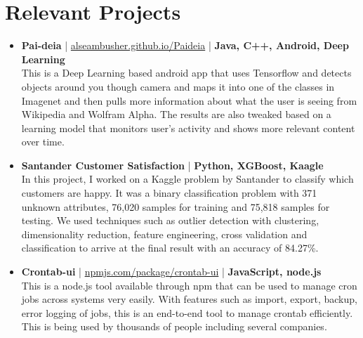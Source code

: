 \section{Relevant Projects}
\begin{itemize}
 \item \textbf{Pai-deia} | \href{http://alseambusher.github.io/Paideia}{alseambusher.github.io/Paideia} | \textbf{Java, C++, Android, Deep Learning}\\
 This is a Deep Learning based android app that uses Tensorflow and detects objects around you though camera and maps it into one of the classes in Imagenet and then pulls more information about what the user is seeing from Wikipedia and Wolfram Alpha. The results are also tweaked based on a learning model that monitors user's activity and shows more relevant content over time.

 \item \textbf{Santander Customer Satisfaction} | \textbf{Python, XGBoost, Kaagle}\\
In this project, I worked on a Kaggle problem by Santander to classify which customers are happy. It was a binary classification problem with 371 unknown attributes, 76,020 samples for training and 75,818 samples for testing. We used techniques such as outlier detection with clustering, dimensionality reduction, feature engineering, cross validation and classification to arrive at the final result with an accuracy of 84.27\%.


 \item \textbf{Crontab-ui} | \href{http://npmjs.com/package/crontab-ui}{npmjs.com/package/crontab-ui} | \textbf{JavaScript, node.js}\\
 This is a node.js tool available through npm that can be used to manage cron jobs across systems very easily. With features such as import, export, backup, error logging of jobs, this is an end-to-end tool to manage crontab efficiently. This is being used by thousands of people including several companies.



\end{itemize}
